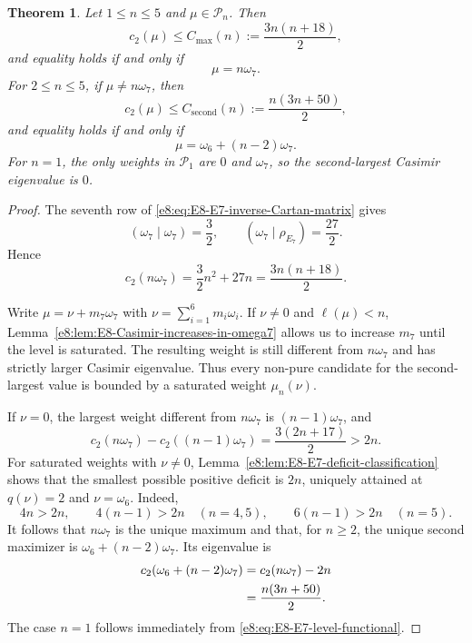 \documentclass[11pt,reqno]{amsart}
\newtheorem{theorem}{Theorem}[section]
\theoremstyle{definition}
\theoremstyle{remark}
\begin{document}
\begin{theorem}
\label{e8:thm:E8-E7-Casimir-maxima}
Let $1\le n\le5$ and $\mu\in\mathcal P_n$.
Then
\begin{equation*}
  c_2(\mu)
  \le C_{\max}(n)
  :=\frac{3n(n+18)}2,
\end{equation*}
and equality holds if and only if
\begin{equation*}
  \mu=n\omega_7.
\end{equation*}
For $2\le n\le5$, if $\mu\ne n\omega_7$, then
\begin{equation*}
  c_2(\mu)
  \le C_{\mathrm{second}}(n)
  :=\frac{n(3n+50)}2,
\end{equation*}
and equality holds if and only if
\begin{equation*}
  \mu=\omega_6+(n-2)\omega_7.
\end{equation*}
For $n=1$, the only weights in $\mathcal P_1$ are $0$ and $\omega_7$,
so the second-largest Casimir eigenvalue is $0$.
\end{theorem}

\begin{proof}
The seventh row of \eqref{e8:eq:E8-E7-inverse-Cartan-matrix} gives
\begin{equation*}
  (\omega_7\mid\omega_7)=\frac32,
  \qquad
  (\omega_7\mid\rho_{E_7})=\frac{27}{2}.
\end{equation*}
Hence
\begin{equation*}
 c_2(n\omega_7)
 =\frac32n^2+27n
 =\frac{3n(n+18)}2.
\end{equation*}

Write $\mu=\nu+m_7\omega_7$ with
$\nu=\sum_{i=1}^{6}m_i\omega_i$.  If $\nu\ne0$ and
$\ell(\mu)<n$, Lemma~\ref{e8:lem:E8-Casimir-increases-in-omega7} allows us
to increase $m_7$ until the level is saturated.  The resulting weight is
still different from $n\omega_7$ and has strictly larger Casimir eigenvalue.
Thus every non-pure candidate for the second-largest value is bounded by a
saturated weight $\mu_n(\nu)$.

If $\nu=0$, the largest weight different from $n\omega_7$ is
$(n-1)\omega_7$, and
\begin{equation*}
 c_2(n\omega_7)-c_2((n-1)\omega_7)
 =\frac{3(2n+17)}2>2n.
\end{equation*}
For saturated weights with $\nu\ne0$, Lemma~\ref{e8:lem:E8-E7-deficit-classification}
shows that the smallest possible positive deficit is $2n$, uniquely attained
at $q(\nu)=2$ and $\nu=\omega_6$.  Indeed,
\begin{equation*}
  4n>2n,
  \qquad
  4(n-1)>2n\quad(n=4,5),
  \qquad
  6(n-1)>2n\quad(n=5).
\end{equation*}
It follows that $n\omega_7$ is the unique maximum and that, for $n\ge2$,
the unique second maximizer is
$\omega_6+(n-2)\omega_7$.  Its eigenvalue is
\begin{align*}
 c_2(\omega_6+(n-2)\omega_7)
 &=c_2(n\omega_7)-2n
 \notag\\
 &=\frac{n(3n+50)}2.
\end{align*}
The case $n=1$ follows immediately from
\eqref{e8:eq:E8-E7-level-functional}.
\end{proof}
\end{document}
